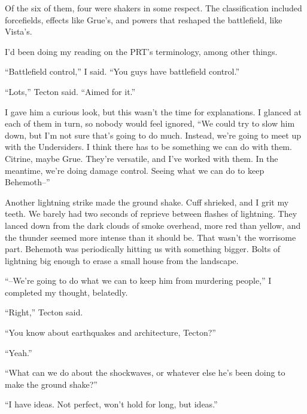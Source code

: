 Of the six of them, four were shakers in some respect.  The classification included forcefields, effects like Grue's, and powers that reshaped the battlefield, like Vista's.



I'd been doing my reading on the PRT's terminology, among other things.



``Battlefield control,'' I said. ``You guys have battlefield control.''



``Lots,'' Tecton said.  ``Aimed for it.''



I gave him a curious look, but this wasn't the time for explanations.  I glanced at each of them in turn, so nobody would feel ignored, ``We could try to slow him down, but I'm not sure that's going to do much.  Instead, we're going to meet up with the Undersiders.  I think there has to be something we can do with them.  Citrine, maybe Grue.  They're versatile, and I've worked with them.   In the meantime, we're doing damage control.  Seeing what we can do to keep Behemoth--''



Another lightning strike made the ground shake.  Cuff shrieked, and I grit my teeth.  We barely had two seconds of reprieve between flashes of lightning.  They lanced down from the dark clouds of smoke overhead, more red than yellow, and the thunder seemed more intense than it should be.  That wasn't the worrisome part.  Behemoth was periodically hitting us with something bigger.  Bolts of lightning big enough to erase a small house from the landscape.



``--We're going to do what we can to keep him from murdering people,'' I completed my thought, belatedly.



``Right,'' Tecton said.



``You know about earthquakes and architecture, Tecton?''



``Yeah.''



``What can we do about the shockwaves, or whatever else he's been doing to make the ground shake?''



``I have ideas.  Not perfect, won't hold for long, but ideas.''




